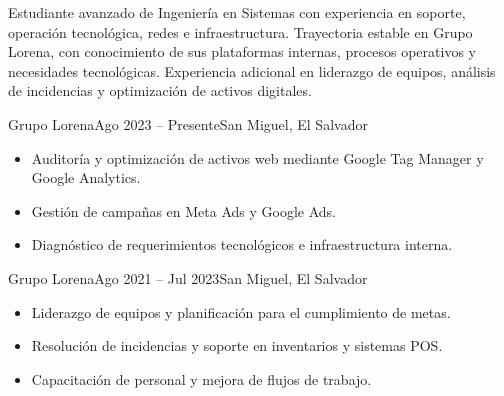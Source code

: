 \documentclass[10pt,a4paper]{Mark_III_Plantilla}
\begin{document}


\begin{fullwidth}
\makecvheader


Estudiante avanzado de Ingeniería en Sistemas con experiencia en soporte,
operación tecnológica, redes e infraestructura. Trayectoria estable en Grupo
Lorena, con conocimiento de sus plataformas internas, procesos operativos y
necesidades tecnológicas. Experiencia adicional en liderazgo de equipos,
análisis de incidencias y optimización de activos digitales.
\end{fullwidth}


\marginpar{\vspace*{\dimexpr1pt-\baselineskip}\raggedright\markiiisidebar}


{Grupo Lorena}{Ago 2023 -- Presente}{San Miguel, El Salvador}
\begin{itemize}
  \item Auditoría y optimización de activos web mediante Google Tag Manager y
  Google Analytics.
  \item Gestión de campañas en Meta Ads y Google Ads.
  \item Diagnóstico de requerimientos tecnológicos e infraestructura interna.
\end{itemize}
\divider

{Grupo Lorena}{Ago 2021 -- Jul 2023}{San Miguel, El Salvador}
\begin{itemize}
  \item Liderazgo de equipos y planificación para el cumplimiento de metas.
  \item Resolución de incidencias y soporte en inventarios y sistemas POS.
  \item Capacitación de personal y mejora de flujos de trabajo.
\end{itemize}
\divider
\end{document}
